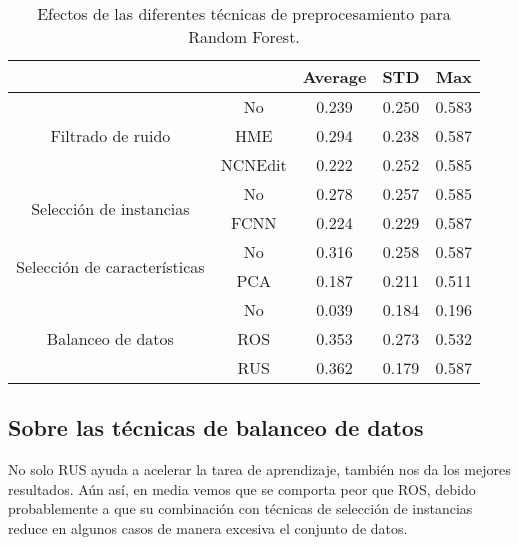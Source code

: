 \begin{table}
    \centering
    \begin{tabular}{cc|c|c|c|}
    \cline{3-5}
    \multicolumn{1}{l}{\textbf{}} & \textbf{} & \multicolumn{1}{c|}{\textbf{Average}} & \multicolumn{1}{c|}{\textbf{STD}} & \textbf{Max} \\ \hline
    \multicolumn{1}{|c|}{\multirow{3}{*}{Filtrado de ruido}}       & No        & 0.239  & 0.250
    & 0.583    \\ \cline{2-5} 
    \multicolumn{1}{|c|}{}  & HME       & 0.294  & 0.238
    & 0.587        \\ \cline{2-5} 
    \multicolumn{1}{|c|}{}  & NCNEdit   & 0.222  & 0.252
    & 0.585        \\ \hline
    \multicolumn{1}{|c|}{\multirow{2}{*}{Selección de instancias}} & No        & 0.278   & 0.257
    & 0.585        \\ \cline{2-5} 
    \multicolumn{1}{|c|}{}  & FCNN      & 0.224  & 0.229
    & 0.587        \\ \hline
    \multicolumn{1}{|c|}{\multirow{2}{*}{Selección de características}} & No        & 0.316  &  0.258
    & 0.587        \\ \cline{2-5} 
    \multicolumn{1}{|c|}{}  & PCA      & 0.187   & 0.211
    & 0.511        \\ \hline
    \multicolumn{1}{|c|}{\multirow{3}{*}{Balanceo de datos}}       & No        & 0.039  & 0.184
    & 0.196        \\ \cline{2-5} 
    \multicolumn{1}{|c|}{}  & ROS       & 0.353  & 0.273
    & 0.532        \\ \cline{2-5} 
    \multicolumn{1}{|c|}{}  & RUS       & 0.362  & 0.179
    & 0.587        \\ \hline
    \end{tabular}
    \caption{Efectos de las diferentes técnicas de preprocesamiento para Random Forest.}
    \label{rf}
\end{table}

\subsection{Sobre las técnicas de balanceo de datos}

No solo RUS ayuda a acelerar la tarea de aprendizaje, también nos da los mejores resultados. Aún así, en media vemos que se comporta peor que ROS, debido probablemente a que su combinación con técnicas de selección de instancias reduce en algunos casos de manera excesiva el conjunto de datos.

